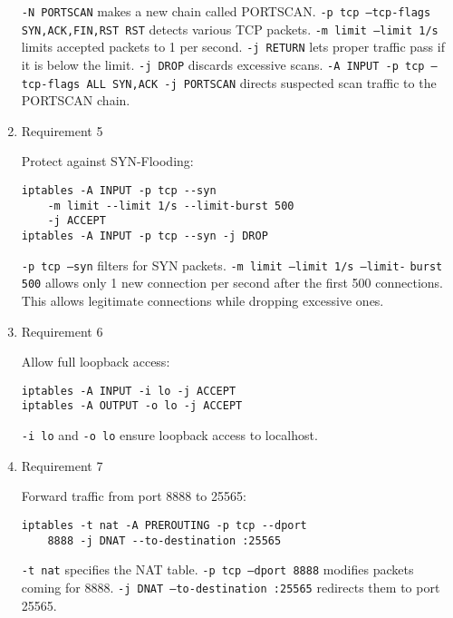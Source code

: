 \documentclass{article}
\begin{document}
\begin{enumerate}
\begin{lstlisting}[basicstyle=\ttfamily,frame=single]
\end{lstlisting}

\noindent
\texttt{-N PORTSCAN} makes a new chain called PORTSCAN.
\texttt{-p tcp --tcp-flags SYN,ACK,FIN,RST RST} detects various TCP packets.
\texttt{-m limit --limit 1/s} limits accepted packets to 1 per second.
\texttt{-j RETURN} lets proper traffic pass if it is below the limit.
\texttt{-j DROP} discards excessive scans.
\texttt{-A INPUT -p tcp --tcp-flags ALL SYN,ACK -j PORTSCAN} directs suspected scan traffic to the PORTSCAN chain.

\item Requirement 5

\noindent
Protect against SYN-Flooding:

\begin{lstlisting}[basicstyle=\ttfamily,frame=single]
iptables -A INPUT -p tcp --syn 
	-m limit --limit 1/s --limit-burst 500
	-j ACCEPT
iptables -A INPUT -p tcp --syn -j DROP
\end{lstlisting}

\noindent
\texttt{-p tcp --syn} filters for SYN packets.
\texttt{-m limit --limit 1/s --limit-} \texttt{burst 500} allows only 1 new connection per second after the first 500 connections.
This allows legitimate connections while dropping excessive ones.

\item Requirement 6

\noindent
Allow full loopback access:

\begin{lstlisting}[basicstyle=\ttfamily,frame=single]
iptables -A INPUT -i lo -j ACCEPT
iptables -A OUTPUT -o lo -j ACCEPT
\end{lstlisting}

\noindent
\texttt{-i lo} and \texttt{-o lo} ensure loopback access to localhost.

\item Requirement 7

\noindent
Forward traffic from port 8888 to 25565:

\begin{lstlisting}[basicstyle=\ttfamily,frame=single]
iptables -t nat -A PREROUTING -p tcp --dport
	8888 -j DNAT --to-destination :25565
\end{lstlisting}

\noindent
\texttt{-t nat} specifies the NAT table.
\texttt{-p tcp --dport 8888} modifies packets coming for 8888.
\texttt{-j DNAT --to-destination :25565} redirects them to port 25565.


\end{enumerate}
\end{document}
